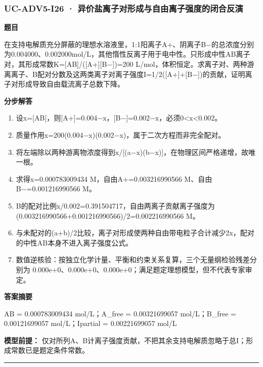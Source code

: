 \documentclass[UTF8,11pt,a4paper]{ctexart}
\begin{document}
\subsubsection*{UC-ADV5-I26 · 异价盐离子对形成与自由离子强度的闭合反演}
\noindent\textbf{题目}\par
在支持电解质充分屏蔽的理想水溶液里，1:1阳离子A+、阴离子B−的总浓度分别为0.004000、0.002000mol/L，其他惰性反离子用于电中性。只形成中性AB离子对，其形成常数K=[AB]/([A+][B−])=200 L/mol，体积恒定。求离子对、两种游离离子、B配对分数及这两类离子对离子强度I=1/2([A+]+[B−])的贡献，证明离子对形成导致自由载流离子总数下降。\par
\medskip\noindent\textbf{分步解答}
\begin{enumerate}
\item 设x=[AB]，则[A+]=0.004−x，[B−]=0.002−x，必须0<x<0.002。
\item 质量作用x=200(0.004−x)(0.002−x)，属于二次方程而非完全配对。
\item 将左端除以两种游离物浓度得到x/[(a−x)(b−x)]，在物理区间严格递增，故唯一根。
\item 求得x=0.000783009434 M，自由A+=0.003216990566 M、自由B−=0.001216990566 M。
\item B的配对比例x/0.002=0.391504717，自由两离子贡献离子强度为(0.003216990566+0.001216990566)/2=0.002216990566 M。
\item 与未配对的(a+b)/2比较，离子对形成使两种自由带电粒子合计减少2x，配对的中性AB本身不进入离子强度公式。
\item 数值逆核验：按独立化学计量、平衡和约束关系复算，三个无量纲检验残差分别为 0.000e+0、0.000e+0、0.000e+0；满足题定理想模型，但不代表专家审定。
\end{enumerate}
\noindent\textbf{答案摘要}\par
AB = 0.000783009434 mol/L；A\_free = 0.00321699057 mol/L；B\_free = 0.00121699057 mol/L；Ipartial = 0.00221699057 mol/L\par
\noindent\textbf{模型前提：}
仅对所列A、B计离子强度贡献，不把其余支持电解质忽略于总I；形成常数已是题定条件常数。\par
\medskip\hrule\medskip
{}
\end{document}
